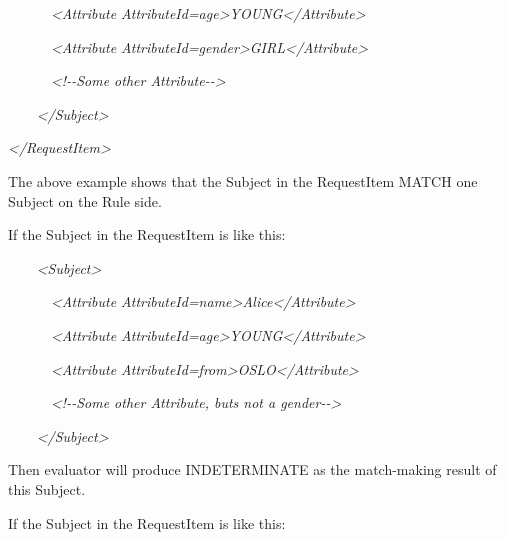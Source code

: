 \documentclass[a4paper]{article}
\begin{document}
{\itshape\color{black}
\ \ \ \ \ \ {\textless}Attribute
AttributeId={\textquotedbl}age{\textquotedbl}{\textgreater}YOUNG{\textless}/Attribute{\textgreater}}

{\itshape\color{black}
\ \ \ \ \ \ {\textless}Attribute
AttributeId={\textquotedbl}gender{\textquotedbl}{\textgreater}GIRL{\textless}/Attribute{\textgreater}}

{\itshape\color{black}
\ \ \ \ \ \ {\textless}!-{}-Some other Attribute-{}-{\textgreater}}

{\itshape\color{black}
\ \ \ \ {\textless}/Subject{\textgreater}}

{\itshape\color{black}
{\textless}/RequestItem{\textgreater}}

{\color{black}
The above example shows that the Subject in the RequestItem
{\textquotedbl}MATCH{\textquotedbl} one Subject on the Rule side.}

{\color{black}
If the Subject in the RequestItem is like this:}

{\itshape\color{black}
\ \ \ \ {\textless}Subject{\textgreater}}

{\itshape\color{black}
\ \ \ \ \ \ {\textless}Attribute
AttributeId={\textquotedbl}name{\textquotedbl}{\textgreater}Alice{\textless}/Attribute{\textgreater}}

{\itshape\color{black}
\ \ \ \ \ \ {\textless}Attribute
AttributeId={\textquotedbl}age{\textgreater}YOUNG{\textless}/Attribute{\textgreater}}

{\itshape\color{black}
\ \ \ \ \ \ {\textless}Attribute
AttributeId={\textquotedbl}from{\textquotedbl}{\textgreater}OSLO{\textless}/Attribute{\textgreater}}

{\itshape\color{black}
\ \ \ \ \ \ {\textless}!-{}-Some other Attribute, buts not a
{\textquotedbl}gender{\textquotedbl}-{}-{\textgreater}}

{\itshape\color{black}
\ \ \ \ {\textless}/Subject{\textgreater}}

{\color{black}
Then evaluator will produce INDETERMINATE as the match-making result of
this Subject.}

{\color{black}
If the Subject in the RequestItem is like this:}
\end{document}
